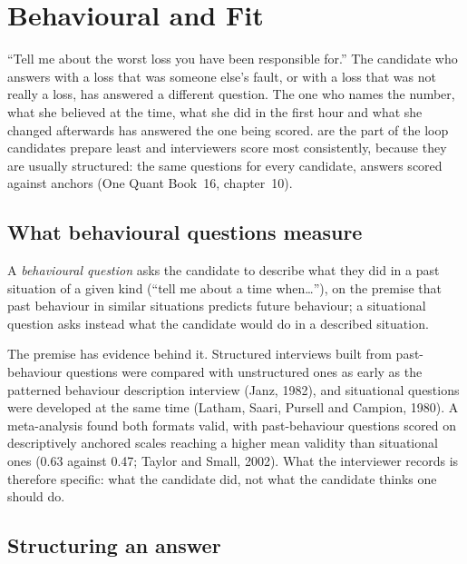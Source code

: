 \chapter{Behavioural and Fit}\label{ch:iv:behavioural-and-fit}

``Tell me about the worst loss you have been responsible for.'' The candidate who answers with a loss that was someone else's
fault, or with a loss that was not really a loss, has answered a different question. The one who names the number, what she
believed at the time, what she did in the first hour and what she changed afterwards has answered the one being scored.
 are the part of the loop candidates prepare least and interviewers score most consistently, because they
are usually structured: the same questions for every candidate, answers scored against anchors (One Quant Book~16, chapter~10).

\section{What behavioural questions measure}

\begin{definition}\label{def:iv:behavioural-and-fit:question}
A \emph{behavioural question} asks the candidate to describe what they did in a past situation of a
given kind (``tell me about a time when\dots''), on the premise that past behaviour in similar situations predicts future
behaviour; a situational question asks instead what the candidate would do in a described situation.
\end{definition}

The premise has evidence behind it. Structured interviews built from past-behaviour questions were compared with unstructured
ones as early as the patterned behaviour description interview (Janz, 1982), and situational questions were developed at the same
time (Latham, Saari, Pursell and Campion, 1980). A meta-analysis found both formats valid, with past-behaviour questions scored on
descriptively anchored scales reaching a higher mean validity than situational ones (0.63 against 0.47; Taylor and Small, 2002).
What the interviewer records is therefore specific: what the candidate did, not what the candidate thinks one should do.

\section{Structuring an answer}

